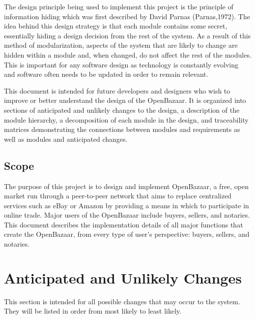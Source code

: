\documentclass{article}
\begin{document}
The design principle being used to implement this project is the principle of information hiding which was first described by David Parnas (Parnas,1972). The idea behind this design strategy is that each module contains some secret, essentially hiding a design decision from the rest of the system. As a result of this method of modularization, aspects of the system that are likely to change are hidden within a module and, when changed, do not affect the rest of the modules. This is important for any software design as technology is constantly evolving and software often needs to be updated in order to remain relevant.

This document is intended for future developers and designers who wish to improve or better understand the design of the OpenBazaar. It is organized into sections of anticipated and unlikely changes to the design, a description of the module hierarchy, a decomposition of each module in the design, and traceability matrices demonstrating the connections between modules and requirements as well as modules and anticipated changes.

\subsection{Scope}
The purpose of this project is to design and implement OpenBazaar, a free, open market run through a peer-to-peer network that aims to replace centralized services such as eBay or Amazon by providing a means in which to participate in online trade. Major users of the OpenBazaar include buyers, sellers, and notaries. This document describes the implementation details of all major functions that create the OpenBazaar, from every type of user's perspective: buyers, sellers, and notaries.


\section*{Anticipated and Unlikely Changes}
This section is intended for all possible changes that may occur to the system. They will be listed in order from most likely to least likely.
\newline
\newline
\end{document}
